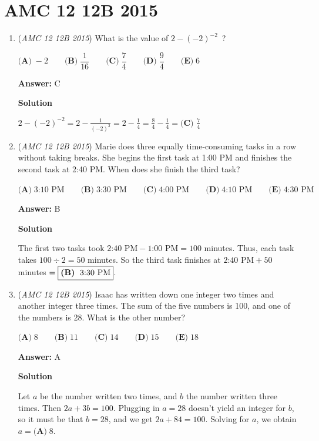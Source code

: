 \section{AMC 12 12B 2015}
        \begin{enumerate}
        	\item (\textit{AMC 12 12B 2015}) What is the value of $2-(-2)^{-2}$ ?


 $\textbf{(A)}\; -2 \qquad\textbf{(B)}\; \dfrac{1}{16} \qquad\textbf{(C)}\; \dfrac{7}{4} \qquad\textbf{(D)}\; \dfrac{9}{4} \qquad\textbf{(E)}\; 6$

 \textbf{Answer: }C



\textbf{Solution}

$2-(-2)^{-2}=2-\frac{1}{(-2)^2}=2-\frac{1}{4}=\frac{8}{4}-\frac{1}{4}=\boxed{\textbf{(C) }\frac{7}{4}}$



	\item (\textit{AMC 12 12B 2015}) Marie does three equally time-consuming tasks in a row without taking breaks. She begins the first task at 1:00 PM and finishes the second task at 2:40 PM. When does she finish the third task?


 $\textbf{(A)}\; \text{3:10 PM} \qquad\textbf{(B)}\; \text{3:30 PM} \qquad\textbf{(C)}\; \text{4:00 PM} \qquad\textbf{(D)}\; \text{4:10 PM} \qquad\textbf{(E)}\; \text{4:30 PM}$

 \textbf{Answer: }B



\textbf{Solution}

The first two tasks took $\text{2:40 PM}-\text{1:00 PM}=100$ minutes. Thus, each task takes $100\div 2=50$ minutes. So the third task finishes at $\text{2:40 PM}+50$ minutes $=\fbox{\textbf{(B)}\; \text{3:30 PM}}$.

 


	\item (\textit{AMC 12 12B 2015}) Isaac has written down one integer two times and another integer three times. The sum of the five numbers is 100, and one of the numbers is 28. What is the other number?


 $\textbf{(A)}\; 8 \qquad\textbf{(B)}\; 11 \qquad\textbf{(C)}\; 14 \qquad\textbf{(D)}\; 15 \qquad\textbf{(E)}\; 18$

 \textbf{Answer: }A



\textbf{Solution}

Let $a$ be the number written two times, and $b$ the number written three times. Then $2a + 3b = 100$. Plugging in $a = 28$ doesn't yield an integer for $b$, so it must be that $b = 28$, and we get $2a + 84 = 100$. Solving for $a$, we obtain $a = \boxed{\textbf{(A)}\; 8}$.


\end{enumerate}
